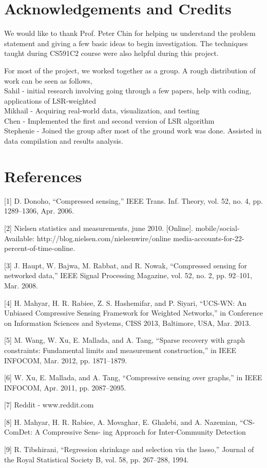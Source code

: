 \documentclass{article}
\begin{document}
\section{Acknowledgements and Credits}
We would like to thank Prof. Peter Chin for helping us understand the problem statement and giving a few basic ideas to
begin investigation. The techniques taught during CS591C2 course were also helpful during this project. 

For most of the project, we worked together as a group. A rough distribution of work can be seen as follows, \\
Sahil - initial research involving going through a few papers, help with coding, applications of LSR-weighted \\
Mikhail - Acquiring real-world data, visualization, and testing\\
Chen - Implemented the first and second version of LSR algorithm \\
Stephenie - Joined the group after most of the ground work was done. Assisted in data compilation and results analysis.

\section*{References}
\small

[1] D. Donoho, “Compressed sensing,” IEEE Trans. Inf. Theory, vol. 52,
no. 4, pp. 1289–1306, Apr. 2006.

[2] Nielsen statistics and measurements, june 2010. [Online].
mobile/social-
Available: http://blog.nielsen.com/nielsenwire/online
media-accounts-for-22-percent-of-time-online.

[3] J. Haupt, W. Bajwa, M. Rabbat, and R. Nowak, “Compressed sensing
for networked data,” IEEE Signal Processing Magazine, vol. 52, no. 2,
    pp. 92–101, Mar. 2008.

[4] H. Mahyar, H. R. Rabiee, Z. S. Hashemifar, and P. Siyari, “UCS-WN: An
Unbiased Compressive Sensing Framework for Weighted Networks,” in
Conference on Information Sciences and Systems, CISS 2013, Baltimore,
USA, Mar. 2013.

[5] M. Wang, W. Xu, E. Mallada, and A. Tang, “Sparse recovery with graph
constraints: Fundamental limits and measurement construction,” in IEEE
INFOCOM, Mar. 2012, pp. 1871–1879.

[6] W. Xu, E. Mallada, and A. Tang, “Compressive sensing over graphs,”
in IEEE INFOCOM, Apr. 2011, pp. 2087–2095.

[7] Reddit - www.reddit.com

[8] H. Mahyar, H. R. Rabiee, A. Movaghar, E. Ghalebi,
and A. Nazemian, “CS-ComDet: A Compressive Sens-
ing Approach for Inter-Community Detection

[9] R. Tibshirani, “Regression shrinkage and selection via
the lasso,” Journal of the Royal Statistical Society B,
vol. 58, pp. 267–288, 1994.
\end{document}
